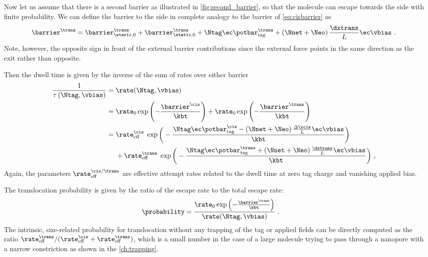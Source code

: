 Now let us assume that there is a second barrier as illustrated in \cref{fig:second_barrier}, so that the
molecule can escape towards the \transi{} side with finite probability. We can define the barrier to the
\transi{} side in complete analogy to the \cisi{} barrier of \cref{eq:cisbarrier} as
%
\begin{align*}
    \barrier^\trans = \barrier^{\trans}_{\steric,0}
        + \barrier^{\trans}_{\static,0}
        + \Ntag \ec  \potbar_{\rm{tag}}^\trans
        + \left(\Nnet + \Neo\right) \frac{\dxtrans}{L}\ec \vbias
        \text{ .}
\end{align*}
%
Note, however, the opposite sign in front of the external barrier contributions since the external force
points in the same direction as the \transi{} exit rather than opposite.

Then the dwell time is given by the inverse of the sum of rates over either barrier
%
\begin{align}\label{eq:double_barrier_rate}
\begin{split}
    \frac{1}{\tau\left(\Ntag,\vbias\right)} ={}& \rate (\Ntag,\vbias)\\
    ={}&
     \rate_0\exp\left(-\frac{\barrier^\cis}{\kbt}\right)
     + \rate_0\exp\left(-\frac{\barrier^\trans}{\kbt}\right)\\
    ={}& \rate^{\cis}_{\rm{eff}}\; \exp\bigg(
        -\frac{\Ntag \ec  \potbar_{\rm{tag}}^\cis
        - \left(\Nnet + \Neo\right) \frac{\Delta \xcis}{L}\ec \vbias}{\kbt}
    \bigg)\\
    &+ \rate^{\trans}_{\rm{eff}}\; \exp\bigg(
        -\frac{\Ntag \ec  \potbar_{\rm{tag}}^\trans
        + \left(\Nnet + \Neo\right) \frac{\dxtrans}{L}\ec \vbias}{\kbt}
    \bigg)
    \text{ ,}
\end{split}
\end{align}
%
Again, the parameters $\rate^{\cis/\trans}_{\rm{eff}}$ are effective attempt rates related to the dwell time at
zero tag charge and vanishing applied bias.

The translocation probability is given by the ratio of the \transi{} escape rate to the total escape rate:
%
\begin{align*}
    \probability ={}& \frac{\rate_0\exp\left(-\frac{\barrier^\trans}{\kbt}\right)}{\rate (\Ntag, \vbias)}
    \text{ .}
\end{align*}
%
The intrinsic, size-related probability for translocation without any trapping of the tag or applied fields
can be directly computed as the ratio $\rate^{\trans}_{\rm{eff}}/(\rate^{\cis}_{\rm{eff}} +
\rate^{\trans}_{\rm eff})$, which is a small number in the case of a large molecule trying to pass through a
nanopore with a narrow \transi{} constriction as shown in the \cref{ch:trapping}.


